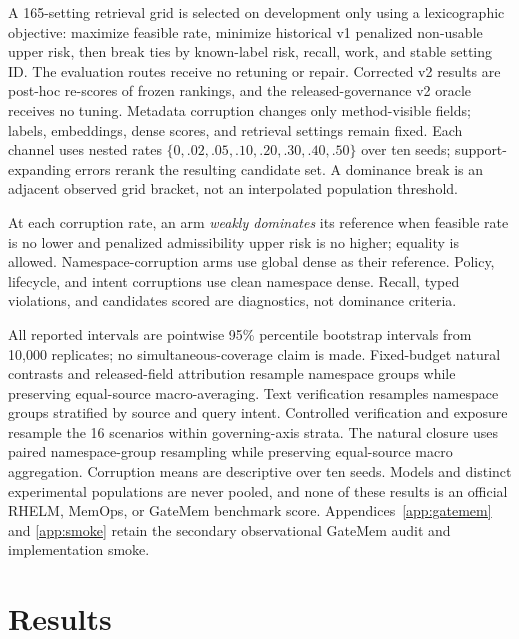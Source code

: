 \documentclass{article}
\begin{document}
A 165-setting retrieval grid is selected on development only using a lexicographic
objective: maximize feasible rate, minimize historical v1 penalized non-usable upper
risk, then break ties by known-label risk, recall, work, and stable setting ID.  The
\NaturalRouteRows{} evaluation routes receive no retuning or repair.  Corrected v2
results are post-hoc re-scores of frozen rankings, and the released-governance v2
oracle receives no tuning.  Metadata corruption changes only method-visible fields;
labels, embeddings, dense scores, and retrieval settings remain fixed.  Each channel
uses nested rates $\{0,.02,.05,.10,.20,.30,.40,.50\}$ over ten seeds; support-expanding
errors rerank the resulting candidate set.  A dominance break is an adjacent observed
grid bracket, not an interpolated population threshold.

At each corruption rate, an arm \emph{weakly dominates} its reference when feasible
rate is no lower and penalized admissibility upper risk is no higher; equality is
allowed.  Namespace-corruption arms use global dense as their reference.  Policy,
lifecycle, and intent corruptions use clean namespace dense.  Recall, typed
violations, and candidates scored are diagnostics, not dominance criteria.

All reported intervals are pointwise 95\% percentile bootstrap intervals from
10,000 replicates; no simultaneous-coverage claim is made.  Fixed-budget natural
contrasts and released-field attribution resample namespace groups while preserving
equal-source macro-averaging.  Text verification resamples namespace groups
stratified by source and query intent.  Controlled verification and exposure
resample the 16 scenarios within governing-axis strata.  The natural closure uses
paired namespace-group resampling while preserving equal-source macro aggregation.
Corruption means are descriptive over ten seeds.  Models and distinct experimental
populations are never pooled, and none of these results is an official RHELM, MemOps,
or GateMem benchmark score.  Appendices~\ref{app:gatemem} and \ref{app:smoke} retain the secondary
observational GateMem audit \citep{ren2026gatemem} and implementation smoke.

\section{Results}

\begin{table}[!t]
  \centering
  \scriptsize
  \setlength{\tabcolsep}{3.2pt}
  \renewcommand{\arraystretch}{1.08}
  \caption{Natural same-population route-to-reader effects.  Entries are namespace
  dense minus global dense with pointwise 95\% paired namespace-group bootstrap
  intervals.  Readers are reported separately and share one blinded Claude Haiku
  judge.  $^{\dagger}$GPT-5.6 Luna is a sequential robustness replication.}
  \label{tab:natural-end-to-end}
  
\end{table}
\end{document}
